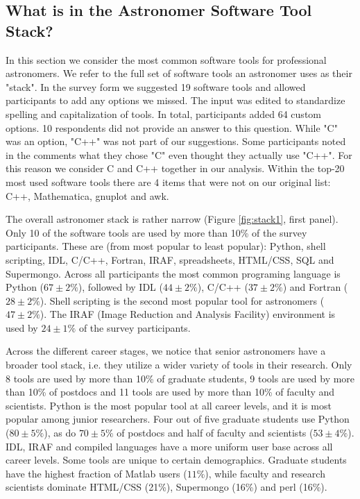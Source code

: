 
\subsection{What is in the Astronomer Software Tool Stack?}

In this section we consider the most common software tools for professional astronomers. We refer to the full set of software tools an astronomer uses as their "stack". In the survey form we suggested 19 software tools and allowed participants to add any options we missed. The input was edited to standardize spelling and capitalization of tools. In total, participants added 64 custom options. 10 respondents did not provide an answer to this question. While "C" was an option, "C++" was not part of our suggestions. Some participants noted in the comments what they chose "C" even thought they actually use "C++". For this reason we consider C and C++ together in our analysis. Within the top-20 most used software tools there are 4 items that were not on our original list: C++, Mathematica, gnuplot and awk.

The overall astronomer stack is rather narrow (Figure \ref{fig:stack1}, first panel). Only 10 of the software tools are used by more than 10\% of the survey participants. These are (from most popular to least popular): Python, shell scripting, IDL, C/C++, Fortran, IRAF, spreadsheets, HTML/CSS, SQL and Supermongo. Across all participants the most common programing language is Python ($67\pm2\%$), followed by IDL ($44\pm2\%$), C/C++ ($37\pm2\%$) and Fortran ($28\pm2\%$). Shell scripting is the second most popular tool for astronomers ($47\pm2\%$).  The IRAF (Image Reduction and Analysis Facility) environment is used by $24\pm1\%$ of the survey participants. 

Across the different career stages, we notice that senior astronomers have a broader tool stack, i.e. they utilize a wider variety of tools in their research. Only 8 tools are used by more than 10\% of graduate students, 9 tools are used by more than 10\% of postdocs and 11 tools are used by more than 10\% of faculty and scientists. Python is the most popular tool at all career levels, and it is most popular among junior researchers. Four out of five graduate students use Python ($80\pm5\%$), as do $70\pm5\%$ of postdocs and half of faculty and scientists ($53\pm4\%$). IDL, IRAF and compiled languages have a more uniform user base across all career levels. Some tools are unique to certain demographics. Graduate students have the highest fraction of Matlab users ($11\%$), while faculty and research scientists dominate HTML/CSS (21\%), Supermongo (16\%) and perl (16\%).

